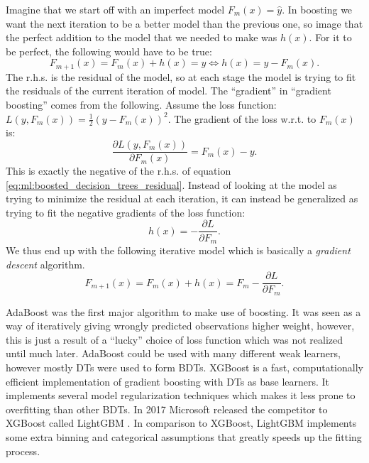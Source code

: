 \documentclass[a4paper, twoside, nobib]{tufte-book}
\newcommand{\q}[1]{``#1''}
\newcommand{\autocite}[1]{\citep{#1}}
\begin{document}
Imagine that we start off with an imperfect model $F_m(x)=\hat{y}$. In boosting we want the next iteration to be a better model than the previous one, so image that the perfect addition to the model that we needed to make was $h(x)$. For it to be perfect, the following would have to be true:
\begin{equation}
  \label{eq:ml:boosted_decision_trees_residual}
  F_{m+1}(x) = F_m(x) + h(x) = y \Leftrightarrow h(x) = y - F_m(x).
\end{equation}
The r.h.s. is the residual of the model, so at each stage the model is trying to fit the residuals of the current iteration of model. The \q{gradient} in \q{gradient boosting} comes from the following. Assume the loss function: $L(y, F_m(x)) = \frac{1}{2}  (y-F_m(x))^2$. The gradient of the loss w.r.t. to $F_m(x)$ is:
\begin{equation}
  \frac{\partial L(y, F_m(x))}{\partial F_m(x)} = F_m(x) - y. 
\end{equation}
This is exactly the negative of the r.h.s. of equation \eqref{eq:ml:boosted_decision_trees_residual}. Instead of looking at the model as trying to minimize the residual at each iteration, it can instead be generalized as trying to fit the negative gradients of the loss function:
\begin{equation}
  h(x) = - \frac{\partial L}{\partial F_m}.
\end{equation}
We thus end up with the following iterative model which is basically a \emph{gradient descent} algorithm.
\begin{equation}
  F_{m+1}(x) = F_m(x) + h(x) = F_m - \frac{\partial L}{\partial F_m}.
\end{equation}


AdaBoost \autocite{freundDesiciontheoreticGeneralizationOnline1995} was the first major algorithm to make use of boosting. It was seen as a way of iteratively giving wrongly predicted observations higher weight, however, this is just a result of a \q{lucky} choice of loss function which was not realized until much later. AdaBoost could be used with many different weak learners, however mostly DTs were used to form BDTs. XGBoost \autocite{chenXGBoostScalableTree2016} is a fast, computationally efficient implementation of gradient boosting with DTs as base learners. It implements several model regularization techniques which makes it less prone to overfitting than other BDTs. In 2017 Microsoft released the competitor to XGBoost called LightGBM \autocite{keLightGBMHighlyEfficient2017}. In comparison to XGBoost, LightGBM implements some extra binning and categorical assumptions that greatly speeds up the fitting process. 
\end{document}
